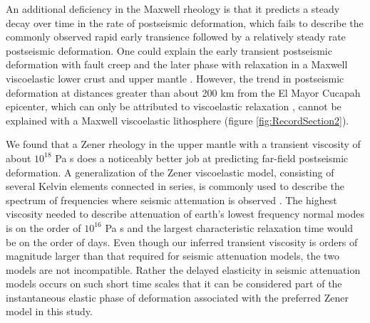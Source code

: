 \documentclass[1p]{elsarticle}
\begin{document}
An additional deficiency in the Maxwell rheology is that it predicts a steady decay over time in the rate of postseismic deformation, which fails to describe the commonly observed rapid early transience followed by a relatively steady rate postseismic deformation.  One could explain the early transient postseismic deformation with fault creep and the later phase with relaxation in a Maxwell viscoelastic lower crust and upper mantle \citep[e.g][]{Hearn2009,Johnson2009}. However, the trend in postseismic deformation at distances greater than about 200 km from the El Mayor Cucapah epicenter, which can only be attributed to viscoelastic relaxation \citep{Freed2007a}, cannot be explained with a Maxwell viscoelastic lithosphere (figure \ref{fig:RecordSection2}). 

We found that a Zener rheology in the upper mantle with a transient viscosity of about $10^{18}$ Pa s does a noticeably better job at predicting far-field postseismic deformation.  A generalization of the Zener viscoelastic model, consisting of several Kelvin elements connected in series, is commonly used to describe the spectrum of frequencies where seismic attenuation is observed \citep{Liu1976}.  The highest viscosity needed to describe attenuation of earth's lowest frequency normal modes is on the order of $10^{16}$ Pa s \citep{Yuen1982} and the largest characteristic relaxation time would be on the order of days. Even though our inferred transient viscosity is orders of magnitude larger than that required for seismic attenuation models, the two models are not incompatible.  Rather the delayed elasticity in seismic attenuation models occurs on such short time scales that it can be considered  part of the instantaneous elastic phase of deformation associated with the preferred Zener model in this study. 
\end{document}
